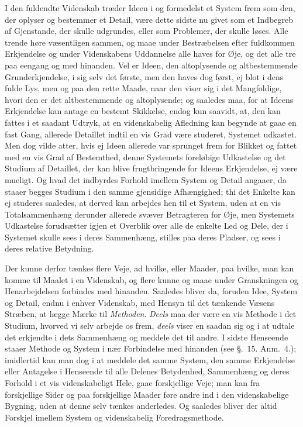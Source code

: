 \documentclass[12pt,a4paper]{book}
\newcommand{\apage}[1]{\marginnote{\footnotesize\textit{[#1]}}}
\begin{document}
I den fuldendte Videnskab træder Ideen i og formedelst et System frem som den, der
oplyser og bestemmer et Detail, være dette sidste nu givet som et Indbegreb af
Gjenstande, der skulle udgrundes, eller som Problemer, der skulle løses. Alle
trende høre væsentligen sammen, og maae under Bestræbelsen efter fuldkommen
Erkjendelse og under Videnskabens Uddannelse alle haves for Øje, og det alle tre
paa eengang og med hinanden. Vel er Ideen, den altoplysende og altbestemmende
Grunderkjendelse, i sig selv det første, men den haves dog først, ej blot i dens
fulde Lys, men og paa den rette Maade, naar den viser sig i det Mangfoldige, hvori
den er det altbestemmende og altoplysende; og saaledes maa, for at Ideens
Erkjendelse kan antage en bestemt Skikkelse, endog kun saavidt, at, den kan fattes
i et saadant Udtryk, at en videnskabelig Afledning kan begynde at gaae en fast
Gang, allerede Detaillet indtil en vis Grad være studeret, Systemet udkastet. Men
dog vilde atter, hvis ej Ideen allerede var sprunget frem for Blikket og fattet
med en vis Grad af Bestemthed, denne Systemets foreløbige Udkastelse og det  \apage{154}
Studium af Detaillet, der kan blive frugtbringende for Ideens Erkjendelse, ej være
mueligt. Og hvad det indbyrdes Forhold imellem System og Detail angaaer, da staaer
begges Studium i den samme gjensidige Afhængighed; thi det Enkelte kan ej studeres
saaledes, at derved kan arbejdes hen til et System, uden at en vis Totalsammenhæng
derunder allerede svæver Betragteren for Øje, men Systemets Udkastelse forudsætter
igjen et Overblik over alle de enkelte Led og Dele, der i Systemet skulle sees i
deres Sammenhæng, stilles paa deres Pladser, og sees i deres relative Betydning.

Der kunne derfor tænkes flere Veje, ad hvilke, eller Maader, paa hvilke, man kan
komme til Maalet i en Videnskab, og flere kunne og maae under Granskningen og
Henarbejdelsen forbindes med hinanden. Saaledes bliver da, foruden Idee, System og
Detail, endnu i enhver Videnskab, med Hensyn til det tænkende Væsens Stræben, at
lægge Mærke til \emph{Methoden}. \emph{Deels} maa der være en vis Methode i det Studium,
hvorved vi selv arbejde os frem, \emph{deels} viser en saadan sig og i at udtale det
erkjendte i dets Sammenhæng og meddele det til andre. I sidste Henseende staaer
Methode og System i nær Forbindelse med hinanden (see §.~15. Anm.~4.); imidlertid
kan man dog i at meddele det samme System, den samme Erkjendelse eller Antagelse i
Henseende til alle Delenes Betydenhed, Sammenhæng og deres Forhold \apage{155} i et vis
videnskabeligt Hele, gaae forskjellige Veje; man kan fra forskjellige Sider og paa
forskjellige Maader føre andre ind i den videnskabelige Bygning, uden at denne
selv tænkes anderledes. Og saaledes bliver der altid Forskjel imellem System og
videnskabelig Foredragsmethode.
\end{document}
